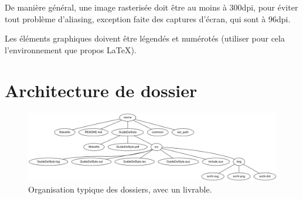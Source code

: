 De manière général, une image rasterisée doit être au moins à 300dpi, pour
éviter tout problème d'aliasing, exception faite des captures d'écran, qui sont
à 96dpi.

Les éléments graphiques doivent être légendés et numérotés (utiliser pour cela
l'environnement  que propos \LaTeX).

\section{Architecture de dossier}
\begin{figure}[h!]
\includegraphics[width=\textwidth]{img/archi.png}
\caption{Organisation typique des dossiers, avec un livrable.}
\end{figure}

